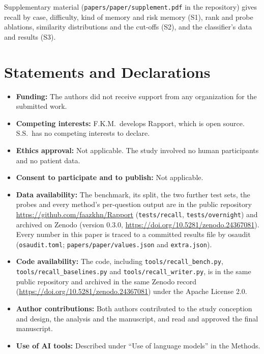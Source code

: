 \documentclass[sn-mathphys-num]{sn-jnl}
\begin{document}
\backmatter

Supplementary material (\texttt{papers/paper/supplement.pdf} in the repository) gives recall by case, difficulty, kind of memory and risk memory (S1), rank and probe ablations,
similarity distributions and the cut-offs (S2), and the classifier's data and results (S3).

\section*{Statements and Declarations}
\begin{itemize}
\item \textbf{Funding:} The authors did not receive support from any organization for the submitted work.
\item \textbf{Competing interests:} F.K.M.\ develops Rapport, which is open source. S.S.\ has no competing interests to declare.
\item \textbf{Ethics approval:} Not applicable. The study involved no human participants and no patient data.
\item \textbf{Consent to participate and to publish:} Not applicable.
\item \textbf{Data availability:} The benchmark, its split, the two further test sets, the probes and every method's per-question output are
in the public repository \url{https://github.com/faazkhn/Rapport} (\texttt{tests/recall}, \texttt{tests/overnight}) and archived on Zenodo
(version 0.3.0, \url{https://doi.org/10.5281/zenodo.24367081}). Every number in this paper is traced to a committed results file by osaudit
(\texttt{osaudit.toml}; \texttt{papers/paper/values.json} and \texttt{extra.json}).
\item \textbf{Code availability:} The code, including \texttt{tools/recall\_bench.py}, \texttt{tools/recall\_baselines.py} and
\texttt{tools/recall\_writer.py}, is in the same public repository and archived in the same Zenodo record (\url{https://doi.org/10.5281/zenodo.24367081}) under the Apache
License 2.0.
\item \textbf{Author contributions:} Both authors contributed to the study conception and design, the analysis and the manuscript, and
read and approved the final manuscript.
\item \textbf{Use of AI tools:} Described under ``Use of language models'' in the Methods.
\end{itemize}


\end{document}
